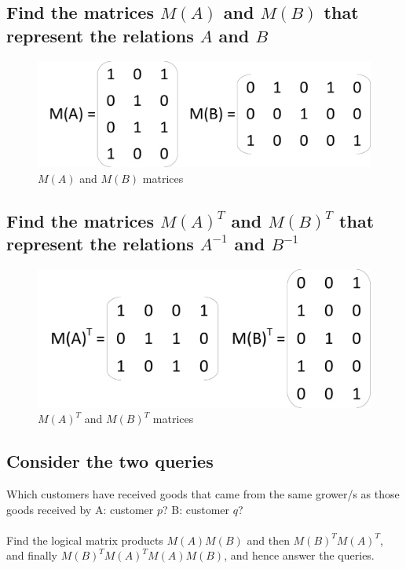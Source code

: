 \documentclass[12pt,a4paper]{article}
\begin{document}
\subsection{Find the matrices $M(A)$ and $M(B)$ that represent the relations $A$ and $B$}

\begin{figure}[h]
\centering
\caption{$M(A)$ and $M(B)$ matrices}
\includegraphics[scale=0.35]{./img/matrix_q2-1.pdf}
\end{figure}

\subsection{Find the matrices $M(A)^T$ and $M(B)^T$ that represent the relations $A^{-1}$ and $B^{-1}$}

\begin{figure}[h]
\centering
\caption{$M(A)^T$ and $M(B)^T$ matrices}
\includegraphics[scale=0.35]{./img/matrix_q2-2.pdf}
\end{figure}

\newpage
\subsection{Consider the two queries}

Which customers have received goods that came from the same grower/s as those goods received by A: customer $p$? B: customer $q$? \\
\\
Find the logical matrix products $M(A)M(B)$ and then $M(B)^TM(A)^T$, and finally $M(B)^TM(A)^TM(A)M(B)$, and hence answer the queries.
\end{document}
